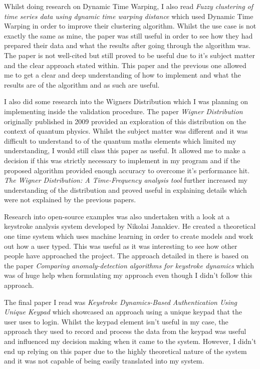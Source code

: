 \documentclass[10pt,a4paper]{report}
\begin{document}
Whilst doing research on Dynamic Time Warping, I also read \emph{Fuzzy clustering of time series data using dynamic time warping distance}\cite{IzakianHesam2015Fcot} which used Dynamic Time Warping in order to improve their clustering algorithm. Whilst the  use case is not exactly the same as mine, the paper was still useful in order to see how they had prepared their data and what the results after going through the algorithm was. The paper is not well-cited but still proved to be useful due to it's subject matter and the clear approach stated within. This paper and the previous one allowed me to get a clear and deep understanding of how to implement and what the results are of the algorithm and as such are useful. 

I also did some research into the Wigners Distribution which I was planning on implementing inside the validation procedure. The paper \emph{Wigner Distribution}\cite{inbook} originally published in 2009 provided an exploration of this distribution on the context of quantum physics. Whilst the subject matter was different and it was difficult to understand to of the quantum maths elements which limited my understanding, I would still class this paper as useful. It allowed me to make a decision if this was strictly necessary to implement in my program and if the proposed algorithm provided enough accuracy to overcome it's performance hit. \emph{The Wigner Distribution: A Time-Frequency analysis tool}\cite{4766782} further increased my understanding of the distribution and proved useful in explaining details which were not explained by the previous papers.

Research into open-source examples was also undertaken with a look at a keystroke analysis system developed by Nikolai Janakiev\cite{janakiev_2018}. He created a theoretical one time system which uses machine learning in order to create models and work out how a user typed. This was useful as it was interesting to see how other people have approached the project. The approach detailed in there is based on the paper \emph{Comparing anomaly-detection algorithms for keystroke dynamics}\cite{5270346} which was of huge help when formulating my approach even though I didn't follow this approach.

The final paper I read was \emph{Keystroke Dynamics-Based Authentication Using Unique Keypad}\cite{s21062242} which showcased an approach using a unique keypad that the user uses to login. Whilst the keypad element isn't useful in my case, the approach they used to record and process the data from the keypad was useful and influenced my decision making when it came to the system. However, I didn't end up relying on this paper due to the highly theoretical nature of the system and it was not capable of being easily translated into my system.
\end{document}
